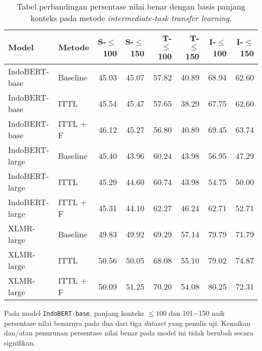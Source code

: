 \begin{table}[H]\centering
\begin{tabular}{llrrrrrr}
\toprule
         Model &   Metode &  S-$\leq$100 &  S-$\leq$150 &  T-$\leq$100 &  T-$\leq$150 &  I-$\leq$100 &  I-$\leq$150 \\
\midrule
 IndoBERT-base & Baseline &                  45.03 &                  45.07 &                  57.82 &                  40.89 &                  68.94 &                  62.60 \\
 IndoBERT-base &     ITTL &                  45.54 &                  45.47 &                  57.65 &                  38.29 &                  67.75 &                  62.60 \\
 IndoBERT-base & ITTL + F &                  46.12 &                  45.27 &                  56.80 &                  40.89 &                  69.45 &                  63.74 \\
\hline
IndoBERT-large & Baseline &                  45.40 &                  43.96 &                  60.24 &                  43.98 &                  56.95 &                  47.29 \\
IndoBERT-large &     ITTL &                  45.29 &                  44.60 &                  60.74 &                  43.98 &                  54.75 &                  50.00 \\
IndoBERT-large & ITTL + F &                  45.31 &                  44.10 &                  62.27 &                  46.24 &                  62.71 &                  52.71 \\
\hline
    XLMR-large & Baseline &                  49.83 &                  49.92 &                  69.29 &                  57.14 &                  79.79 &                  71.79 \\
    XLMR-large &     ITTL &                  50.56 &                  50.05 &                  68.08 &                  55.10 &                  79.02 &                  74.87 \\
    XLMR-large & ITTL + F &                  50.09 &                  51.25 &                  70.20 &                  54.08 &                  80.25 &                  72.31 \\
\bottomrule
\end{tabular}
\caption{Tabel perbandingan persentase nilai benar dengan basis panjang konteks pada metode \emph{intermediate-task transfer learning}.}
\end{table}

Pada model \texttt{IndoBERT-base}, panjang konteks $\leq100$ dan 101$-$150 naik persentase nilai benarnya pada dua dari tiga \emph{dataset} yang penulis uji. Kenaikan dan/atau penurunan persentase nilai benar pada model ini tidak berubah secara signifikan.


